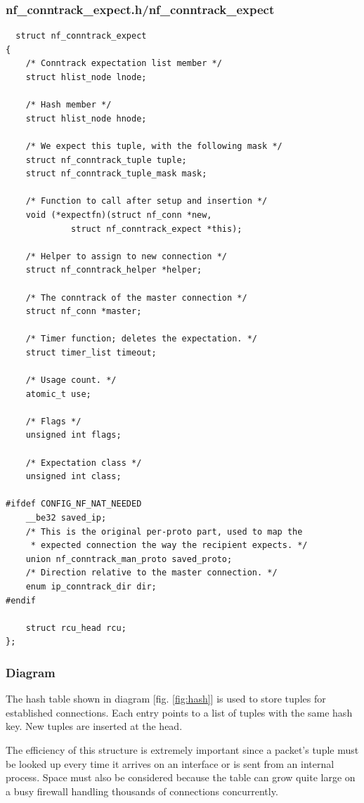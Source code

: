 \documentclass[a4paper,10pt]{article}
\newcommand{\figref}[1]{[fig. \ref{#1}]}
\begin{document}
\subsubsection{nf\_conntrack\_expect.h/nf\_conntrack\_expect}

\begin{lstlisting}
  struct nf_conntrack_expect
{
	/* Conntrack expectation list member */
	struct hlist_node lnode;

	/* Hash member */
	struct hlist_node hnode;

	/* We expect this tuple, with the following mask */
	struct nf_conntrack_tuple tuple;
	struct nf_conntrack_tuple_mask mask;

	/* Function to call after setup and insertion */
	void (*expectfn)(struct nf_conn *new,
			 struct nf_conntrack_expect *this);

	/* Helper to assign to new connection */
	struct nf_conntrack_helper *helper;

	/* The conntrack of the master connection */
	struct nf_conn *master;

	/* Timer function; deletes the expectation. */
	struct timer_list timeout;

	/* Usage count. */
	atomic_t use;

	/* Flags */
	unsigned int flags;

	/* Expectation class */
	unsigned int class;

#ifdef CONFIG_NF_NAT_NEEDED
	__be32 saved_ip;
	/* This is the original per-proto part, used to map the
	 * expected connection the way the recipient expects. */
	union nf_conntrack_man_proto saved_proto;
	/* Direction relative to the master connection. */
	enum ip_conntrack_dir dir;
#endif

	struct rcu_head rcu;
};
\end{lstlisting}


\subsubsection{Diagram}

The hash table shown in diagram \figref{fig:hash} is used to store
tuples for established connections. Each entry points to a list of tuples
with the same hash key. New tuples are inserted at the head.

The efficiency of this structure is extremely important since a packet's tuple must be
looked up every time it arrives on an interface or is sent from an
internal process. Space must also be considered because the table can
grow quite large on a busy firewall handling thousands of connections
concurrently.
\end{document}
